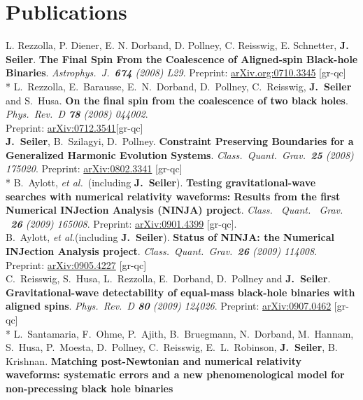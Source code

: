 \documentclass[11pt]{seilercv}
\begin{document}
\section{Publications}
{ {L. Rezzolla, P. Diener, E. N. Dorband, D. Pollney, C. Reisswig, E. Schnetter, {\bf J. Seiler}.}  \textbf{The Final Spin From the Coalescence of Aligned-spin Black-hole Binaries}.  \textit{Astrophys.\ J.\  {\bf 674} (2008) L29}.  
Preprint:   \href{http://arxiv.org/abs/0710.3345}{arXiv.org:0710.3345} [gr-qc]}\vspace{0.2cm} \\*
{ {L.~Rezzolla, E.~Barausse, E.~N.~Dorband, D.~Pollney, C.~Reisswig, {\bf J.~Seiler} and S.~Husa}. \textbf{On the final spin from the coalescence of two black holes}.  \textit{Phys.\ Rev.\  D {\bf 78} (2008) 044002}. \\ Preprint: \href{http://arxiv.org/abs/0712.3541}{arXiv:0712.3541}[gr-qc] \vspace{0.2cm} \\
{{\bf J.~Seiler}, B.~Szilagyi, D.~Pollney}.  \textbf{Constraint Preserving Boundaries for a Generalized Harmonic Evolution Systems}.  \textit{Class.\ Quant.\ Grav.\  {\bf 25} (2008) 175020}. Preprint: \href{http://arxiv.org/abs/0802.3341}{arXiv:0802.3341} [gr-qc]\vspace{0.2cm} \\*
{B.~Aylott, {\it et al.}~(including {\bf J.~Seiler})}. \textbf{Testing gravitational-wave searches with numerical relativity waveforms:
Results from the first Numerical INJection Analysis (NINJA) project}.
\textit{Class. \ Quant. \ Grav. \ {\bf 26} (2009) 165008}. Preprint: \href{http://arxiv.org/abs/0901.4399}{arXiv:0901.4399} [gr-qc]. \vspace{0.2cm} \\
{B.~Aylott, {\it et al.}(including {\bf J.~Seiler})}. \textbf{Status of NINJA: the Numerical INJection Analysis project}.  \textit{Class.\ Quant.\ Grav.\ {\bf 26} (2009) 114008}. Preprint: \href{http://arxiv.org/abs/0905.4227}{arXiv:0905.4227} [gr-qc] \vspace{0.2cm} \\
{C.~Reisswig, S.~Husa, L.~Rezzolla, E.~Dorband, D.~Pollney and {\bf J.~Seiler}}.
\textbf{Gravitational-wave detectability of equal-mass black-hole binaries with aligned spins}. \textit{Phys.\ Rev.\  D {\bf 80} (2009) 124026}. Preprint: \href{http://arxiv.org/abs/0907.0462}{arXiv:0907.0462} [gr-qc] \vspace{0.2cm} \\*
{L.~Santamaria, F.~Ohme, P.~Ajith, B.~Bruegmann, N.~Dorband, M.~Hannam, S.~Husa, P.~Moesta, D.~Pollney, C.~Reisswig, E.~L.~Robinson, {\bf J.~Seiler}, B. Krishnan. }\textbf{Matching post-Newtonian and numerical relativity waveforms: systematic errors and a new phenomenological model for non-precessing black hole binaries}
}
\end{document}
